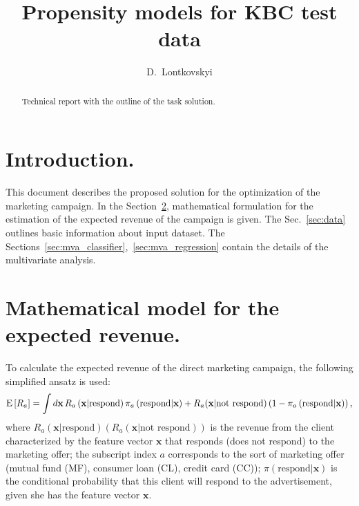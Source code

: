 \documentclass[14pt]{scrartcl}
\title{Propensity models for KBC test data}
\author{D.~Lontkovskyi}
\begin{document}
\maketitle

\begin{abstract}
Technical report with the outline of the task solution.
\end{abstract}
\section{Introduction.}
This document describes the proposed solution for the optimization of the marketing
campaign. In the Section~\ref{sec:math}, mathematical formulation for the estimation of the
expected revenue of the campaign is given. The Sec.~\ref{sec:data} outlines basic 
information about input dataset. The Sections~\ref{sec:mva_classifier},~\ref{sec:mva_regression}
contain the details of the multivariate analysis.
\section{Mathematical model for the expected revenue.}\label{sec:math}
To calculate the expected revenue of the direct marketing campaign, the following simplified ansatz is used:
\begin{equation}
    \textmd{E}\left[R_a\right] =  \int d\mathbf{x}\,R_a \left( \textbf{x}|\textrm{respond} \right) \pi_{a}\left(\textrm{respond}|\textbf{x}\right) + 
                                                    R_a(\textbf{x}|\textrm{not respond}) \left(1 - \pi_{a}\left(\textrm{respond}|\textbf{x}\right) \right),
\end{equation}
where $R_a \left( \textbf{x}|\textrm{respond} \right) \left(R_a \left( \textbf{x}|\textrm{not respond} \right)\right)$ is the revenue from the client characterized
by the feature vector $\textbf{x}$ that responds (does not respond) 
to the marketing offer; the subscript index $a$ corresponds to the sort
of marketing offer (mutual fund (MF), consumer loan (CL), credit card (CC)); 
$\pi\left(\textrm{respond}|\textbf{x}\right)$ is the conditional probability that 
this client will respond to the advertisement, given she has the feature vector 
$\textbf{x}$.
\end{document}
